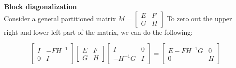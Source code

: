 \documentclass[11pt]{article}
\newcommand{\subsubsubsection}[1]{\noindent\textbf{#1}\\}
\begin{document}
\subsubsubsection{Block diagonalization}
Consider a general partitioned matrix $M= \left[ \begin{array}{cc} E & F \\ G & H \end{array} \right]$ To zero out the upper right and lower left part of the matrix, we can do the following:

$$
\left[ \begin{array}{cc} I & -FH^{-1} \\ 0 & I \end{array} \right]
\left[ \begin{array}{cc} E & F \\ G & H \end{array} \right]
\left[ \begin{array}{cc} I & 0 \\ -H^{-1}G & I \end{array} \right]
=
\left[ \begin{array}{cc} E-FH^{-1}G & 0 \\ 0 & H \end{array} \right]
$$
\end{document}
